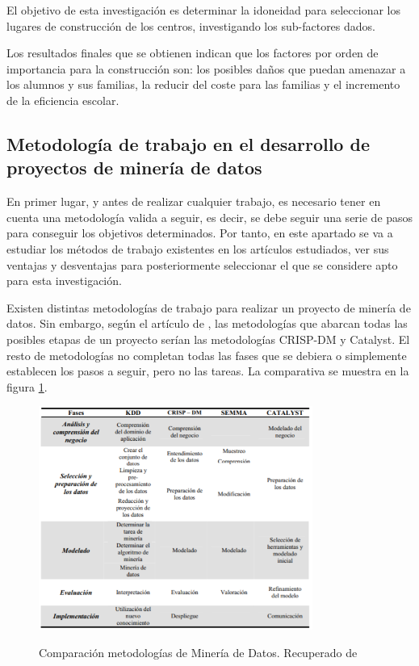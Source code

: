 El objetivo de esta investigación es determinar la idoneidad para seleccionar los lugares de construcción de los centros, investigando los sub-factores dados.

Los resultados finales que se obtienen indican que los factores por orden de importancia para la construcción son: los posibles daños que puedan amenazar a los alumnos y sus familias, la reducir del coste para las familias y el incremento de la eficiencia escolar.

\subsection{Metodología de trabajo en el desarrollo de proyectos de minería de datos}
En primer lugar, y antes de realizar cualquier trabajo, es necesario tener en cuenta una metodología valida a seguir, es decir, se debe seguir una serie de pasos para conseguir los objetivos determinados. Por tanto, en este apartado se va a estudiar los métodos de trabajo existentes en los artículos estudiados, ver sus ventajas y desventajas para posteriormente seleccionar el que se considere apto para esta investigación.

Existen distintas metodologías de trabajo para realizar un proyecto de minería de datos. Sin embargo, según el artículo de , las metodologías que abarcan todas las posibles etapas de un proyecto serían las metodologías CRISP-DM y Catalyst. El resto de metodologías no completan todas las fases que se debiera o simplemente establecen los pasos a seguir, pero no las tareas. La comparativa se muestra en la figura \ref{fig:compMod}.

\begin{figure}[htb]
	\centering
	\caption{
		Comparación metodologías de Minería de Datos. Recuperado de \protect{}
	}
	\includegraphics[width=0.8\textwidth]{recursos/ComparacionModelosDM}
	\label{fig:compMod}
\end{figure}
\FloatBarrier



